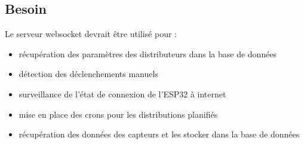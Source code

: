 \subsection{Besoin}
Le serveur websocket devrait être utilisé pour : 
\begin{itemize}
\item récupération des paramètres des distributeurs dans la base de données
\item détection des déclenchements manuels 
\item surveillance de l'état de connexion de l'ESP32 à internet
\item mise en place des crons pour les distributions planifiés
\item récupération des données des capteurs et les stocker dans la base de données
\end{itemize}

